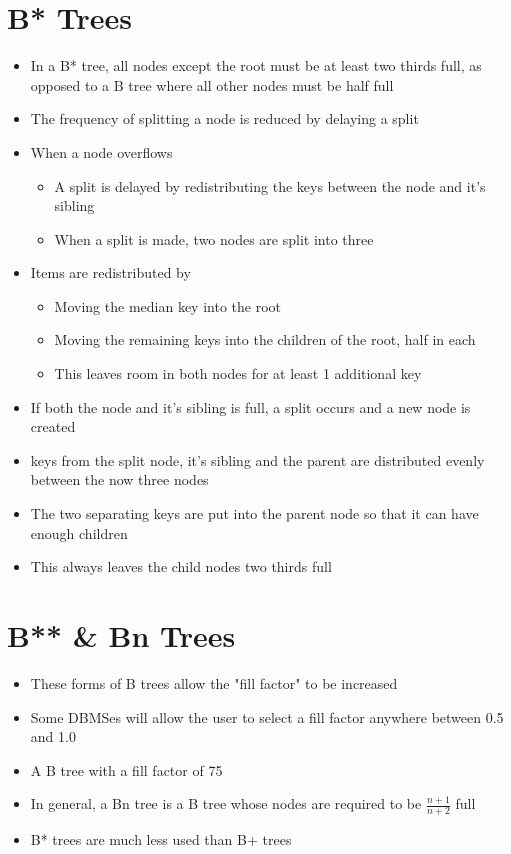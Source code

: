\section*{B* Trees}

\begin{itemize}
  \item In a B* tree, all nodes except the root must be at least two thirds full, as opposed to a B tree where all other nodes must be half full
  \item The frequency of splitting a node is reduced by delaying a split
  \item When a node overflows
  \begin{itemize}
    \item A split is delayed by redistributing the keys between the node and it's sibling
    \item When a split is made, two nodes are split into three
  \end{itemize}
  \item Items are redistributed by
  \begin{itemize}
    \item Moving the median key into the root
    \item Moving the remaining keys into the children of the root, half in each
    \item This leaves room in both nodes for at least 1 additional key
  \end{itemize}
  \item If both the node and it's sibling is full, a split occurs and a new node is created
  \item keys from the split node, it's sibling and the parent are distributed evenly between the now three nodes
  \item The two separating keys are put into the parent node so that it can have enough children
  \item This always leaves the child nodes two thirds full
\end{itemize}

\section*{B** \& Bn Trees}

\begin{itemize}
  \item These forms of B trees allow the "fill factor" to be increased
  \item Some DBMSes will allow the user to select a fill factor anywhere between 0.5 and 1.0
  \item A B tree with a fill factor of 75%
  \item In general, a Bn tree is a B tree whose nodes are required to be $\frac{n + 1}{n + 2}$ full
  \item B* trees are much less used than B+ trees
\end{itemize}

